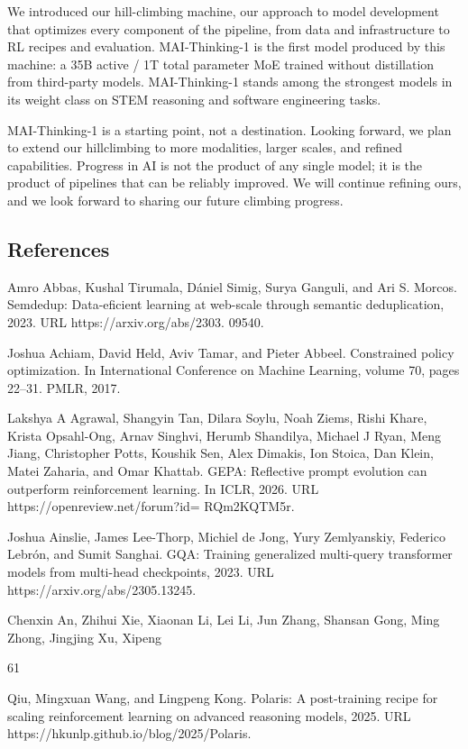 \documentclass[
  10
]{article}
\begin{document}
We introduced our hill-climbing machine, our approach to model
development that optimizes every component of the pipeline, from data
and infrastructure to RL recipes and evaluation. MAI-Thinking-1 is the
first model produced by this machine: a 35B active / 1T total parameter
MoE trained without distillation from third-party models. MAI-Thinking-1
stands among the strongest models in its weight class on STEM reasoning
and software engineering tasks.

MAI-Thinking-1 is a starting point, not a destination. Looking forward,
we plan to extend our hillclimbing to more modalities, larger scales,
and refined capabilities. Progress in AI is not the product of any
single model; it is the product of pipelines that can be reliably
improved. We will continue refining ours, and we look forward to sharing
our future climbing progress.

\subsection{References}\label{references}

Amro Abbas, Kushal Tirumala, Dániel Simig, Surya Ganguli, and Ari S.
Morcos. Semdedup: Data-eficient learning at web-scale through semantic
deduplication, 2023. URL https://arxiv.org/abs/2303. 09540.

Joshua Achiam, David Held, Aviv Tamar, and Pieter Abbeel. Constrained
policy optimization. In International Conference on Machine Learning,
volume 70, pages 22--31. PMLR, 2017.

Lakshya A Agrawal, Shangyin Tan, Dilara Soylu, Noah Ziems, Rishi Khare,
Krista Opsahl-Ong, Arnav Singhvi, Herumb Shandilya, Michael J Ryan, Meng
Jiang, Christopher Potts, Koushik Sen, Alex Dimakis, Ion Stoica, Dan
Klein, Matei Zaharia, and Omar Khattab. GEPA: Reflective prompt
evolution can outperform reinforcement learning. In ICLR, 2026. URL
https://openreview.net/forum?id= RQm2KQTM5r.

Joshua Ainslie, James Lee-Thorp, Michiel de Jong, Yury Zemlyanskiy,
Federico Lebrón, and Sumit Sanghai. GQA: Training generalized
multi-query transformer models from multi-head checkpoints, 2023. URL
https://arxiv.org/abs/2305.13245.

Chenxin An, Zhihui Xie, Xiaonan Li, Lei Li, Jun Zhang, Shansan Gong,
Ming Zhong, Jingjing Xu, Xipeng

61

Qiu, Mingxuan Wang, and Lingpeng Kong. Polaris: A post-training recipe
for scaling reinforcement learning on advanced reasoning models, 2025.
URL https://hkunlp.github.io/blog/2025/Polaris.
\end{document}

